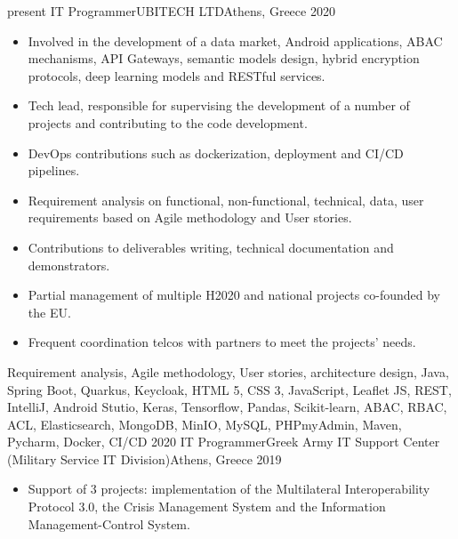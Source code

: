 \begin{experiences}
\experience
    {present}   {IT Programmer}{UBITECH LTD}{Athens, Greece}
    {2020} {
                    \begin{itemize}
                    
                        \item Involved in the development of a data market, Android applications, ABAC mechanisms, API Gateways,
                                                        semantic models design, hybrid encryption protocols, deep learning models and RESTful services.
                                                        
                        \item Tech lead, responsible for supervising the development of a number of projects and contributing to the code development.
                        
                        \item DevOps contributions such as dockerization, deployment and CI/CD pipelines.

                        \item Requirement analysis on functional, non-functional, technical, data, user requirements based on Agile methodology and User stories.
                        
                        \item Contributions to deliverables writing, technical documentation and demonstrators.
                        
                        \item Partial management of multiple H2020 and national projects co-founded by the EU.

                        \item Frequent coordination telcos with partners to meet the projects' needs.

                    \end{itemize}
                    }
                    {Requirement analysis, Agile methodology, User stories, architecture design, Java, Spring Boot, Quarkus, Keycloak, HTML 5, CSS 3, JavaScript, Leaflet JS, REST, IntelliJ, Android Stutio, Keras, Tensorflow, Pandas, Scikit-learn, ABAC, RBAC, ACL, Elasticsearch, MongoDB, MinIO, MySQL, PHPmyAdmin, Maven, Pycharm, Docker, CI/CD}
  \emptySeparator
  \experience
    {2020}   {IT Programmer}{Greek Army IT Support Center (Military Service IT Division)}{Athens, Greece}
    {2019} {
                    \begin{itemize}
                      \item Support of 3 projects: implementation of the Multilateral Interoperability Protocol 3.0, the Crisis Management System
                      and the Information Management-Control System.


\end{itemize}}
\end{experiences}
